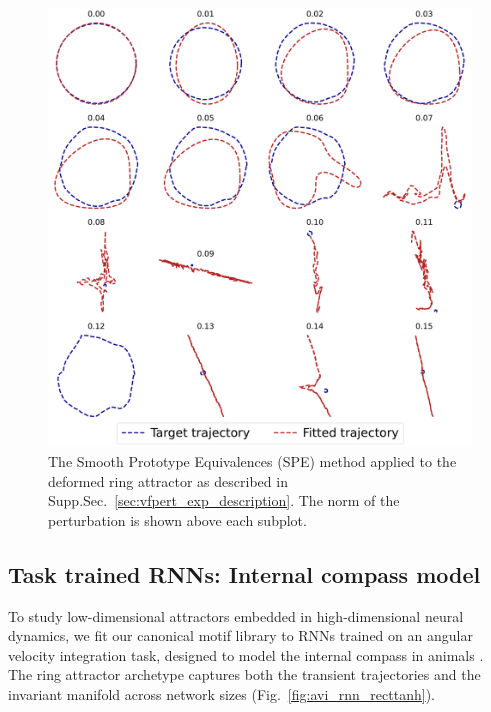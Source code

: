 \documentclass{article}
\theoremstyle{definition} \newtheorem{definition}{Definition}  \newtheorem{example}{Example}
\theoremstyle{remark} \newtheorem{remark}{Remark}
\newcounter{ct}
\begin{document}
\begin{figure}[htbp]
    \centering
    \includegraphics[width=\linewidth]{perturbed_both_trajectories_asy_spe}
    \caption{The Smooth Prototype Equivalences (SPE\citep{friedman2025characterizing}) method applied to the deformed ring attractor as described in Supp.Sec.~\ref{sec:vfpert_exp_description}.
    The norm of the perturbation is shown above each subplot.
     }
    \label{fig:perturbed_both_trajectories_asy_spe}
\end{figure}



\clearpage  
\subsection{Task trained RNNs: Internal compass model}
To study low-dimensional attractors embedded in high-dimensional neural dynamics, we fit our canonical motif library to RNNs trained on an angular velocity integration task, designed to model the internal compass in animals \citep{Sagodi2024a}. 
The ring attractor archetype captures both the transient trajectories and the invariant manifold across network sizes (Fig.~\ref{fig:avi_rnn_recttanh}).
\end{document}
